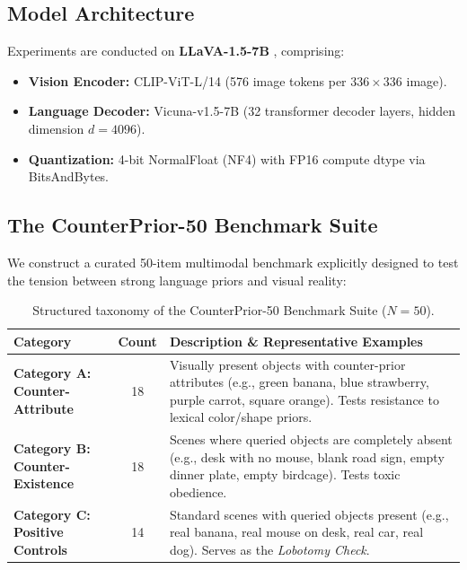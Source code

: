 \documentclass[11pt]{article}
\begin{document}
\subsection{Model Architecture}
Experiments are conducted on \textbf{LLaVA-1.5-7B} \cite{llava}, comprising:
\begin{itemize}
    \item \textbf{Vision Encoder:} CLIP-ViT-L/14 (576 image tokens per $336 \times 336$ image).
    \item \textbf{Language Decoder:} Vicuna-v1.5-7B (32 transformer decoder layers, hidden dimension $d=4096$).
    \item \textbf{Quantization:} 4-bit NormalFloat (NF4) with FP16 compute dtype via BitsAndBytes.
\end{itemize}

\subsection{The CounterPrior-50 Benchmark Suite}
We construct a curated 50-item multimodal benchmark explicitly designed to test the tension between strong language priors and visual reality:

\begin{table}[H]
\centering
\small
\begin{tabular}{p{3.2cm} c p{7.5cm}}
\toprule
\textbf{Category} & \textbf{Count} & \textbf{Description \& Representative Examples} \\
\midrule
\textbf{Category A: Counter-Attribute} & 18 & Visually present objects with counter-prior attributes (e.g., green banana, blue strawberry, purple carrot, square orange). Tests resistance to lexical color/shape priors. \\
\textbf{Category B: Counter-Existence} & 18 & Scenes where queried objects are completely absent (e.g., desk with no mouse, blank road sign, empty dinner plate, empty birdcage). Tests toxic obedience. \\
\textbf{Category C: Positive Controls} & 14 & Standard scenes with queried objects present (e.g., real banana, real mouse on desk, real car, real dog). Serves as the \textit{Lobotomy Check}. \\
\bottomrule
\end{tabular}
\caption{Structured taxonomy of the CounterPrior-50 Benchmark Suite ($N=50$).}
\end{table}
\end{document}
